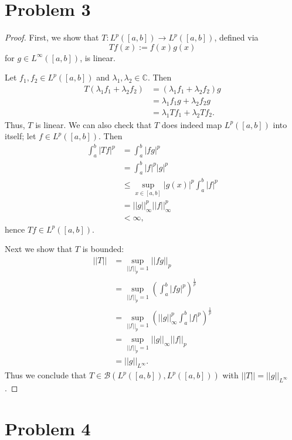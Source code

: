 \documentclass{article}
\newcommand{\C}{\mathbb{C}} %
\begin{document}
\section*{Problem 3}
\begin{proof}
	First, we show that $T: L^{p}([a, b]) \to L^{p}([a, b])$, defined via
	\begin{equation}
		Tf(x) := f(x)g(x)
	\end{equation}
	for $g \in L^{\infty}([a, b])$, is linear.
	
	Let $f_1, f_2 \in L^{p}([a, b])$ and $\lambda_1, \lambda_2 \in \C$. Then
	\begin{align}
		T(\lambda_1 f_1 + \lambda_2 f_2) &= (\lambda_1 f_1 + \lambda_2 f_2)g\\
		&= \lambda_1 f_1 g + \lambda_2 f_2 g \\
		&= \lambda_1 Tf_1 + \lambda_2 Tf_2.
	\end{align}
	Thus, $T$ is linear. We can also check that $T$ does indeed map $L^p([a, b])$ into itself; let $f \in L^{p}([a, b])$. Then
	\begin{align}
		\int_a ^b |Tf|^p &= \int_a ^b |fg|^p \\
		&= \int_a ^b |f|^p |g|^p \\
		&\leq \sup_{x \in [a, b]}|g(x)|^p \int_a ^b |f|^p \\
		&= ||g||_{\infty}^p ||f||_{\infty}^p \\
		&< \infty,
	\end{align}
	hence $Tf \in L^p ([a, b])$. 
	
	Next we show that $T$ is bounded:
	\begin{align}
		||T|| &= \sup_{||f||_p = 1}||fg||_p \\
		&= \sup_{||f||_p=1}\left(\int_a ^b |fg|^p\right)^\frac{1}{p} \\
		&= \sup_{||f||_p = 1} \left(||g||_{\infty}^p \int_a ^b |f|^p\right)^\frac{1}{p} \\
		&= \sup_{||f||_p = 1} ||g||_{\infty} ||f||_p \\
		&= ||g||_{L^{\infty}}.
	\end{align}
	Thus we conclude that $T \in \mathcal{B}(L^p([a, b]), L^p([a, b]))$ with $||T|| = ||g||_{L^{\infty}}$.
\end{proof}
\section*{Problem 4}
\end{document}
